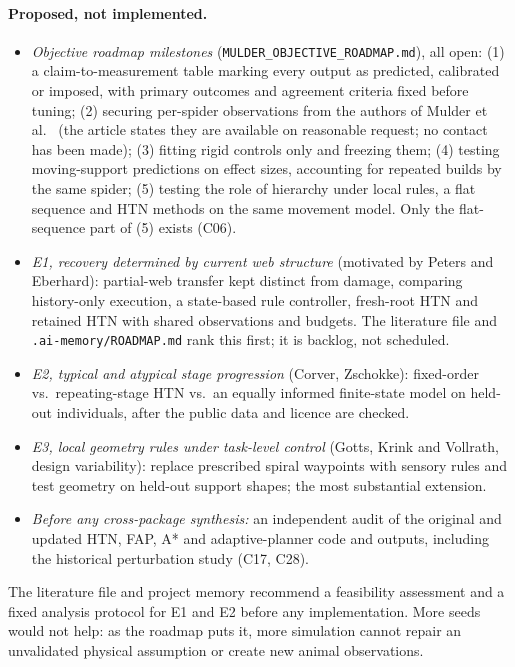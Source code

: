 \paragraph{Proposed, not implemented.}
\begin{itemize}
  \item \emph{Objective roadmap milestones} (\texttt{MULDER\_\allowbreak{}OBJECTIVE\_\allowbreak{}ROADMAP.md}), all open: (1) a
    claim-to-measurement table marking every output as predicted, calibrated or imposed, with primary outcomes and
    agreement criteria fixed before tuning; (2) securing per-spider observations from the authors of
    Mulder et al.~\cite{mulder2021dynamic} (the article states they are available on reasonable request; no
    contact has been made); (3) fitting rigid controls only and freezing them; (4) testing moving-support
    predictions on effect sizes, accounting for repeated builds by the same spider; (5) testing the role of
    hierarchy under local rules, a flat sequence and HTN methods on the same movement model. Only the
    flat-sequence part of (5) exists (C06).
  \item \emph{E1, recovery determined by current web structure} (motivated by Peters and Eberhard): partial-web
    transfer kept distinct from damage, comparing history-only execution, a state-based rule controller, fresh-root
    HTN and retained HTN with shared observations and budgets. The literature file and \texttt{.ai-memory/\allowbreak{}ROADMAP.md}
    rank this first; it is backlog, not scheduled.
  \item \emph{E2, typical and atypical stage progression} (Corver, Zschokke): fixed-order vs.\ repeating-stage HTN
    vs.\ an equally informed finite-state model on held-out individuals, after the public data and licence are
    checked.
  \item \emph{E3, local geometry rules under task-level control} (Gotts, Krink and Vollrath, design variability):
    replace prescribed spiral waypoints with sensory rules and test geometry on held-out support shapes; the most
    substantial extension.
  \item \emph{Before any cross-package synthesis:} an independent audit of the original and updated HTN, FAP, A*
    and adaptive-planner code and outputs, including the historical perturbation study (C17, C28).
\end{itemize}
The literature file and project memory recommend a feasibility assessment and a fixed analysis protocol for E1 and
E2 before any implementation. More seeds would not help: as the roadmap puts it, more simulation cannot repair an
unvalidated physical assumption or create new animal observations.
